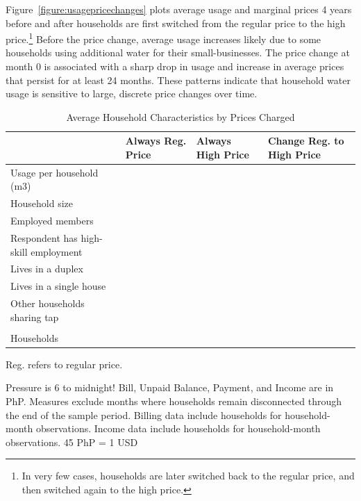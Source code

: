 \documentclass[12pt,table]{article}
\begin{document}
Figure~\ref{figure:usagepricechanges} plots average usage and marginal prices 4 years before and after households are first switched from the regular price to the high price.\footnote{In very few cases, households are later switched back to the regular price, and then switched again to the high price.}  Before the price change, average usage increases likely due to some households using additional water for their small-businesses.  The price change at month 0 is associated with a sharp drop in usage and increase in average prices that persist for at least 24 months.  These patterns indicate that household water usage is sensitive to large, discrete price changes over time.  


\begin{table}[h!] %
\centering
\caption{Average Household Characteristics by Prices Charged}\label{table:pricechangestatistics}
\vspace{-2mm}
\begin{threeparttable}
\begin{tabular}{@{}l*{1}{KKK}@{}}
\toprule
  & Always Reg. Price & Always High Price  & Change Reg. to High Price \\
\midrule
Usage per household (m3)&  \\
Household size &  \\
Employed members &  \\
Respondent has high-skill employment &  \\
Lives in a duplex&  \\
Lives in a single house&  \\
Other households sharing tap&  \\
\\[-.5em]
Households &  \\
\bottomrule
\end{tabular}
\begin{tablenotes}
\footnotesize
\item  Reg. refers to regular price.  

Pressure is 6 to midnight! Bill, Unpaid Balance, Payment, and Income are in PhP.  Measures exclude months where households remain disconnected through the end of the sample period.  Billing data include households for household-month observations.  Income data include households for household-month observations.  45 PhP = 1 USD \,\,
\end{tablenotes}
\end{threeparttable}
\end{table}
\end{document}
